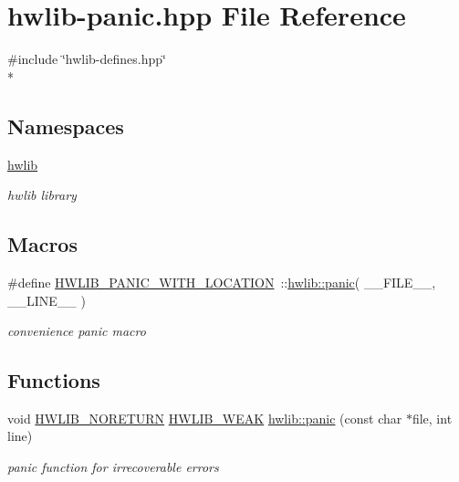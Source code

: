 \hypertarget{hwlib-panic_8hpp}{}\section{hwlib-\/panic.hpp File Reference}
\label{hwlib-panic_8hpp}
{\ttfamily \#include \char`\"{}hwlib-\/defines.\+hpp\char`\"{}}\\*
\subsection*{Namespaces}
\begin{DoxyCompactItemize}
\item 
 \hyperlink{namespacehwlib}{hwlib}
\begin{DoxyCompactList}\small\item\em hwlib library \end{DoxyCompactList}\end{DoxyCompactItemize}
\subsection*{Macros}
\begin{DoxyCompactItemize}
\item 
\#define \hyperlink{hwlib-panic_8hpp_a63e41f8f1231b208819549fe26a58440}{H\+W\+L\+I\+B\+\_\+\+P\+A\+N\+I\+C\+\_\+\+W\+I\+T\+H\+\_\+\+L\+O\+C\+A\+T\+I\+ON}~\+::\hyperlink{namespacehwlib_adc07d80c1eeeabf8c96b6acbd5dce78f}{hwlib\+::panic}( \+\_\+\+\_\+\+F\+I\+L\+E\+\_\+\+\_\+, \+\_\+\+\_\+\+L\+I\+N\+E\+\_\+\+\_\+ )
\begin{DoxyCompactList}\small\item\em convenience panic macro \end{DoxyCompactList}\end{DoxyCompactItemize}
\subsection*{Functions}
\begin{DoxyCompactItemize}
\item 
void \hyperlink{hwlib-defines_8hpp_aef311f1f416fdcbd1fa22376dcc01029}{H\+W\+L\+I\+B\+\_\+\+N\+O\+R\+E\+T\+U\+RN} \hyperlink{hwlib-defines_8hpp_a04be4340016df60d6636c1d1c6d94fc9}{H\+W\+L\+I\+B\+\_\+\+W\+E\+AK} \hyperlink{namespacehwlib_adc07d80c1eeeabf8c96b6acbd5dce78f}{hwlib\+::panic} (const char $\ast$file, int line)
\begin{DoxyCompactList}\small\item\em panic function for irrecoverable errors \end{DoxyCompactList}\end{DoxyCompactItemize}


